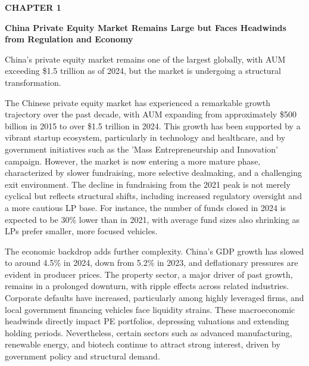 \documentclass[10pt,a4paper]{article}
\begin{document}
\clearpage
\label{chap:1}
{\textcolor{BOBlue}{\scriptsize\bfseries CHAPTER 1}}\par\vspace{-1pt}
{\Large\sffamily\bfseries\color{BONavy} China Private Equity Market Remains Large but Faces Headwinds from Regulation and Economy}\par\vspace{4pt}
{\textcolor{BOBlue}{\normalsize China's private equity market remains one of the largest globally, with AUM exceeding \$1.5 trillion as of 2024, but the market is undergoing a structural transformation.}}\par\vspace{3pt}
\begin{minipage}[t]{0.58\linewidth}
{\small The Chinese private equity market has experienced a remarkable growth trajectory over the past decade, with AUM expanding from approximately \$500 billion in 2015 to over \$1.5 trillion in 2024. This growth has been supported by a vibrant startup ecosystem, particularly in technology and healthcare, and by government initiatives such as the 'Mass Entrepreneurship and Innovation' campaign. However, the market is now entering a more mature phase, characterized by slower fundraising, more selective dealmaking, and a challenging exit environment. The decline in fundraising from the 2021 peak is not merely cyclical but reflects structural shifts, including increased regulatory oversight and a more cautious LP base. For instance, the number of funds closed in 2024 is expected to be 30\% lower than in 2021, with average fund sizes also shrinking as LPs prefer smaller, more focused vehicles.}\par
{\small The economic backdrop adds further complexity. China's GDP growth has slowed to around 4.5\% in 2024, down from 5.2\% in 2023, and deflationary pressures are evident in producer prices. The property sector, a major driver of past growth, remains in a prolonged downturn, with ripple effects across related industries. Corporate defaults have increased, particularly among highly leveraged firms, and local government financing vehicles face liquidity strains. These macroeconomic headwinds directly impact PE portfolios, depressing valuations and extending holding periods. Nevertheless, certain sectors such as advanced manufacturing, renewable energy, and biotech continue to attract strong interest, driven by government policy and structural demand.}\par

\end{minipage}
\end{document}

